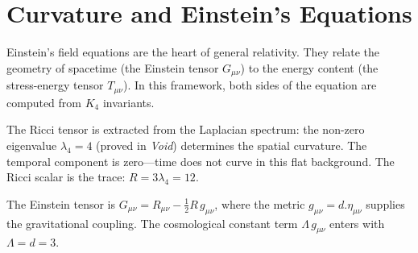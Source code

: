 \documentclass[11pt,a4paper]{book}
\def\cdot{.}%
\begin{document}
\begin{code}
\\
%
\\[\AgdaEmptyExtraSkip]%
\>[0]\<%
\\
\>[0]\<%
\\
\>[0][@{}l@{\AgdaIndent{0}}]%
\>[2]\AgdaSpace{}%
\<%
\\
%
\\[\AgdaEmptyExtraSkip]%
%
\>[2]\AgdaSpace{}%
\AgdaSymbol{:}\AgdaSpace{}%
\AgdaSymbol{(}\AgdaSpace{}%
\AgdaSymbol{:}\AgdaSpace{}%
\AgdaSymbol{)}\AgdaSpace{}%
\AgdaSpace{}%
\AgdaSpace{}%
\AgdaSpace{}%
\AgdaSpace{}%
\AgdaSpace{}%
\AgdaSpace{}%
\<%
\\
%
\>[2]\AgdaSpace{}%
\AgdaSpace{}%
\AgdaSymbol{=}\AgdaSpace{}%
\<%
\end{code}

\chapter{Curvature and Einstein's Equations}
\label{ch:einstein-equations}

Einstein's field equations are the heart of general relativity. They relate the geometry of spacetime (the Einstein tensor $G_{\mu\nu}$) to the energy content (the stress-energy tensor $T_{\mu\nu}$). In this framework, both sides of the equation are computed from $K_4$ invariants.

The Ricci tensor is extracted from the Laplacian spectrum: the non-zero eigenvalue $\lambda_4 = 4$ (proved in \textit{Void}) determines the spatial curvature. The temporal component is zero---time does not curve in this flat background. The Ricci scalar is the trace: $R = 3\lambda_4 = 12$.

The Einstein tensor is $G_{\mu\nu} = R_{\mu\nu} - \frac{1}{2}R\,g_{\mu\nu}$, where the metric $g_{\mu\nu} = d \cdot \eta_{\mu\nu}$ supplies the gravitational coupling. The cosmological constant term $\Lambda\,g_{\mu\nu}$ enters with $\Lambda = d = 3$.
\end{document}
